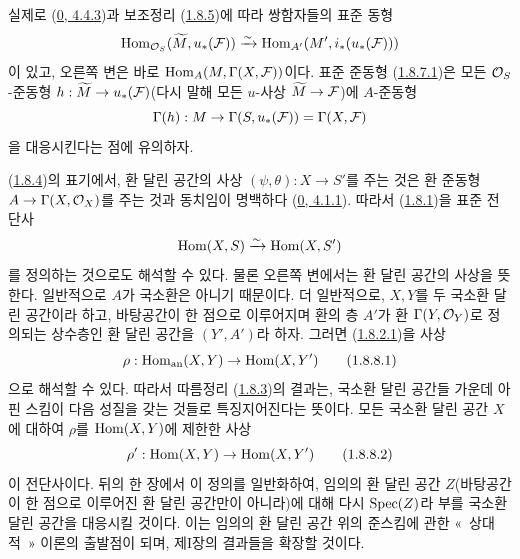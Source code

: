 실제로 (\hyperref[0.4.4.3-ko]{0, 4.4.3})과 보조정리
(\hyperref[ega2:addendum:I.1.8.5-ko]{1.8.5})에 따라 쌍함자들의 표준
동형
\[
  \operatorname{Hom}_{\mathcal{O}_S}(\widetilde M,u_*(\mathcal{F}))
  \xrightarrow{\sim}\operatorname{Hom}_{A'}(M',i_*(u_*(\mathcal{F})))
\]
이 있고, 오른쪽 변은 바로 $\operatorname{Hom}_A(M,\Gamma(X,\mathcal{F}))$이다. 표준
준동형 (\hyperref[ega2:addendum:I.1.8.7.1-ko]{1.8.7.1})은 모든
$\mathcal{O}_S$-준동형 $h:\widetilde M\to u_*(\mathcal{F})$(다시 말해 모든
$u$-사상 $\widetilde M\to\mathcal{F}$)에 $A$-준동형
\[
  \Gamma(h):M\to\Gamma(S,u_*(\mathcal{F}))=\Gamma(X,\mathcal{F})
\]
을 대응시킨다는 점에 유의하자.

\begin{env}[1.8.8]
\label{ega2:addendum:I.1.8.8-ko}
(\hyperref[ega2:addendum:I.1.8.4-ko]{1.8.4})의 표기에서, 환 달린 공간의
사상 $(\psi,\theta):X\to S'$를 주는 것은 환 준동형
$A\to\Gamma(X,\mathcal{O}_X)$를 주는 것과 동치임이 명백하다
(\hyperref[0.4.1.1-ko]{0, 4.1.1}). 따라서
(\hyperref[ega2:addendum:I.1.8.1-ko]{1.8.1})을 표준 전단사
\[
  \operatorname{Hom}(X,S)\xrightarrow{\sim}\operatorname{Hom}(X,S')
\]
를 정의하는 것으로도 해석할 수 있다. 물론 오른쪽 변에서는 환 달린
공간의 사상을 뜻한다. 일반적으로 $A$가 국소환은 아니기 때문이다.
더 일반적으로, $X,Y$를 두 국소환 달린 공간이라 하고, 바탕공간이 한
점으로 이루어지며 환의 층 $A'$가 환 $\Gamma(Y,\mathcal{O}_Y)$로 정의되는
상수층인 환 달린 공간을 $(Y',A')$라 하자. 그러면
(\hyperref[ega2:addendum:I.1.8.2.1-ko]{1.8.2.1})을 사상
\begin{equation}
\label{ega2:addendum:I.1.8.8.1-ko}
  \rho:\operatorname{Hom}_{\mathrm{an}}(X,Y)\to\operatorname{Hom}(X,Y')
\tag{1.8.8.1}
\end{equation}
으로 해석할 수 있다. 따라서 따름정리
(\hyperref[ega2:addendum:I.1.8.3-ko]{1.8.3})의 결과는, 국소환 달린
공간들 가운데 아핀 스킴이 다음 성질을 갖는 것들로 특징지어진다는
뜻이다. 모든 국소환 달린 공간 $X$에 대하여 $\rho$를
$\operatorname{Hom}(X,Y)$에 제한한 사상
\begin{equation}
\label{ega2:addendum:I.1.8.8.2-ko}
  \rho':\operatorname{Hom}(X,Y)\to\operatorname{Hom}(X,Y')
\tag{1.8.8.2}
\end{equation}
이 전단사이다. 뒤의 한 장에서 이 정의를 일반화하여, 임의의 환 달린
공간 $Z$(바탕공간이 한 점으로 이루어진 환 달린 공간만이 아니라)에
대해 다시 $\operatorname{Spec}(Z)$라 부를 국소환 달린 공간을 대응시킬 것이다. 이는
임의의 환 달린 공간 위의 준스킴에 관한 «~상대적~» 이론의 출발점이
되며, 제I장의 결과들을 확장할 것이다.
\end{env}
